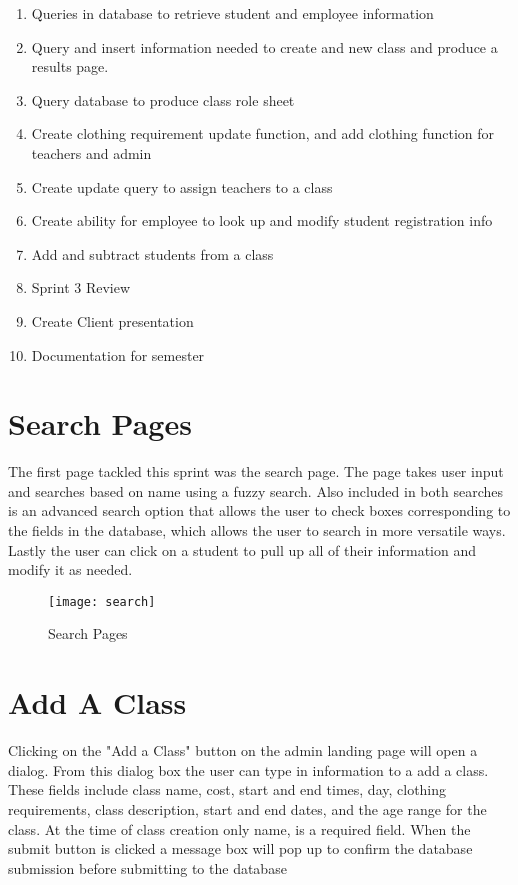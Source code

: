 \documentclass{book}
\begin{document}
\begin{enumerate}
\item Queries in database to retrieve student and employee information
\item Query and insert information needed to create and new class and produce a results page.
\item Query database to produce class role sheet
\item Create clothing requirement update function, and add clothing function for teachers and admin
\item Create update query to assign teachers to a class
\item Create ability for employee to look up and modify student registration info
\item Add and subtract students from a class
\item Sprint 3 Review
\item Create Client presentation
\item Documentation for semester
\end{enumerate}

\section{Search Pages}
The first page tackled this sprint was the search page. The page takes user input and searches based on name using a fuzzy search. Also included in both searches is an advanced search option that allows the user to check boxes corresponding to the fields in the database, which allows the user to search in more versatile ways. Lastly the user can click on a student to pull up all of their information and modify it as needed.


\begin{figure}
\caption{Search Pages}
\centering
\texttt{[image: search]}
\end{figure}

\section{Add A Class}
Clicking on the "Add a Class" button on the admin landing page will open a dialog. From this dialog box the user can type in information to a add a class. These fields include class name, cost, start and end times, day, clothing requirements, class description, start and end dates, and the age range for the class.  At the time of class creation only name, is a required field. When the submit button is clicked a message box will pop up to confirm the database submission before submitting to the database  
\end{document}
